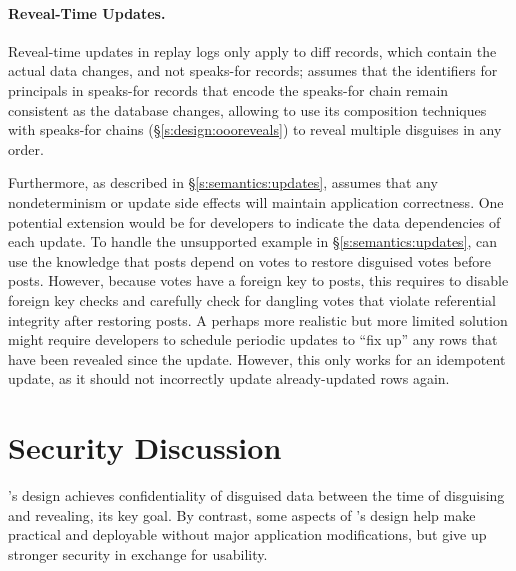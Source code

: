 
\paragraph{Reveal-Time Updates.}
\label{s:design:updates:limitations}
%
%

%
Reveal-time updates in replay logs only apply to diff records, which contain the actual
data changes, and not speaks-for records; \sys assumes that the identifiers for
principals in speaks-for records that encode the speaks-for chain remain
consistent as the database changes, allowing \sys to use its composition
techniques with speaks-for chains (\S\ref{s:design:oooreveals}) to reveal
multiple disguises in any order.
%

%
Furthermore, as described in \S\ref{s:semantics:updates}, \sys assumes that
any nondeterminism or update side effects will maintain application
correctness.
%
One potential extension would be for developers to indicate the data
dependencies of each update. To handle the unsupported example in
\S\ref{s:semantics:updates}, \sys can use the knowledge that posts depend on
votes to restore disguised votes before posts. However, because votes have a
foreign key to posts, this requires \sys to disable foreign key checks and
carefully check for dangling votes that violate referential integrity after
restoring posts.
%
A perhaps more realistic but more limited solution might require developers to
schedule periodic updates to ``fix up'' any rows that
have been revealed since the update. However, this only works for an idempotent
update, as it should not incorrectly update already-updated rows again.  
%


\section{Security Discussion}
\label{s:eval-security}


%
%
\sys's design achieves confidentiality of disguised data between the time of
disguising and revealing, its key goal.
%
By contrast, some aspects of \sys's design help make \sys practical and
deployable without major application modifications, but give up stronger
security in exchange for usability.
%

